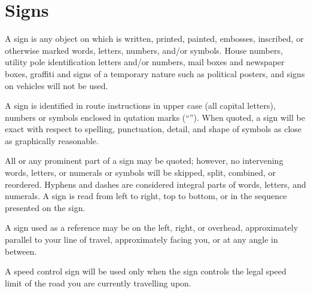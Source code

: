 \section{Signs}

\hiddensubsection{}
A sign is any object on which is written, printed, painted, embosses, inscribed, or otherwise marked words, letters, numbers, and/or symbols.  House numbers, utility pole identification letters and/or numbers, mail boxes and newspaper boxes, graffiti and signs of a temporary nature such as political posters, and signs on vehicles will not be used.

\hiddensubsection{}
A sign is identified in route instructions in upper case (all capital letters), numbers or symbols enclosed in qutation marks (``'').  When quoted, a sign will be exact with respect to spelling, punctuation, detail, and shape of symbols as close as graphically reasonable.

\hiddensubsection{}
All or any prominent part of a sign may be quoted; however, no intervening words, letters, or numerals or symbols will be skipped, split, combined, or reordered.  Hyphens and dashes are considered integral parts of words, letters, and numerals.  A sign is read from left to right, top to bottom, or in the sequence presented on the sign.

\hiddensubsection{}
A sign used as a reference may be on the left, right, or overhead, approximately parallel to your line of travel, approximately facing you, or at any angle in between.

\hiddensubsection{}
A speed control sign will be used only when the sign controls the legal speed limit of the road you are currently travelling upon.
